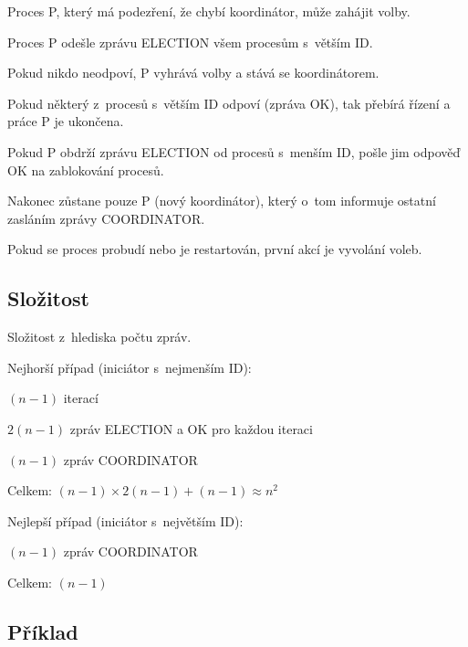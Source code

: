 \begin{compactitem}
    \item Proces P, který má podezření, že chybí koordinátor, může zahájit volby.
    \begin{compactenum}
        \item Proces P odešle zprávu ELECTION všem procesům s~větším ID.
        \item Pokud nikdo neodpoví, P vyhrává volby a stává se koordinátorem.
        \item Pokud některý z~procesů s~větším ID odpoví (zpráva OK), tak přebírá řízení a práce P je ukončena.
        \item Pokud P obdrží zprávu ELECTION od procesů s~menším ID, pošle jim odpověď OK na zablokování procesů.
    \end{compactenum}
    \item Nakonec zůstane pouze P (nový koordinátor), který o~tom informuje ostatní zasláním zprávy COORDINATOR.
    \item Pokud se proces probudí nebo je restartován, první akcí je vyvolání voleb.
\end{compactitem}

\subsection{Složitost}

Složitost z~hlediska počtu zpráv.

\bigskip\noindent Nejhorší případ (iniciátor s~nejmenším ID):

\begin{compactitem}
    \item $(n-1)$ iterací
    \item $2(n-1)$ zpráv ELECTION a OK pro každou iteraci
    \item $(n-1)$ zpráv COORDINATOR
    \item Celkem: $(n-1) \times 2(n-1) + (n-1) \approx n^2$
\end{compactitem}

\noindent Nejlepší případ (iniciátor s~největším ID):

\begin{compactitem}
    \item $(n-1)$ zpráv COORDINATOR
    \item Celkem: $(n-1)$
\end{compactitem}

\subsection{Příklad}

